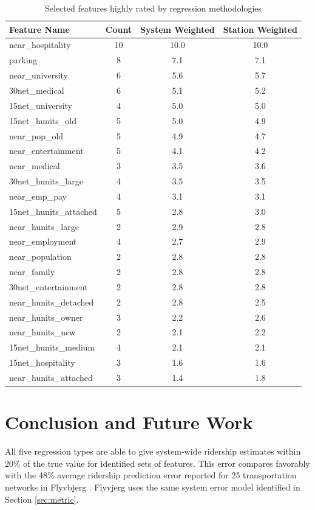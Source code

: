 \documentclass[11pt]{article}
\begin{document}
\begin{table}[H]
\begingroup\fontsize{10}{15}\selectfont
\centering
\begin{tabular}{lccc}
\toprule
Feature Name&Count&System Weighted&Station Weighted\\
\midrule
near\_hospitality&10&10.0&10.0\\
parking&8&7.1&7.1\\
near\_university&6&5.6&5.7\\
30net\_medical&6&5.1&5.2\\
15net\_university&4&5.0&5.0\\
15net\_hunits\_old&5&5.0&4.9\\
near\_pop\_old&5&4.9&4.7\\
near\_entertainment&5&4.1&4.2\\
near\_medical&3&3.5&3.6\\
30net\_hunits\_large&4&3.5&3.5\\
near\_emp\_pay&4&3.1&3.1\\
15net\_hunits\_attached&5&2.8&3.0\\
near\_hunits\_large&2&2.9&2.8\\
near\_employment&4&2.7&2.9\\
near\_population&2&2.8&2.8\\
near\_family&2&2.8&2.8\\
30net\_entertainment&2&2.8&2.8\\
near\_hunits\_detached&2&2.8&2.5\\
near\_hunits\_owner&3&2.2&2.6\\
near\_hunits\_new&2&2.1&2.2\\
15net\_hunits\_medium&4&2.1&2.1\\
15net\_hospitality&3&1.6&1.6\\
near\_hunits\_attached&3&1.4&1.8\\
\end{tabular}
\caption{Selected features highly rated by regression methodologies}\label{tab:featuresum}
\endgroup
\end{table}


\section{Conclusion and Future Work}\label{sec:acc}

All five regression types are able to give system-wide ridership estimates within 20\% of the true value for identified sets of features. This error compares favorably with the 48\% average ridership prediction  error reported for 25 transportation networks in Flyvbjerg \cite{Flyvbjerg2006}. Flyvjerg uses the same system error model identified in Section  \ref{sec:metric}. 
\end{document}
